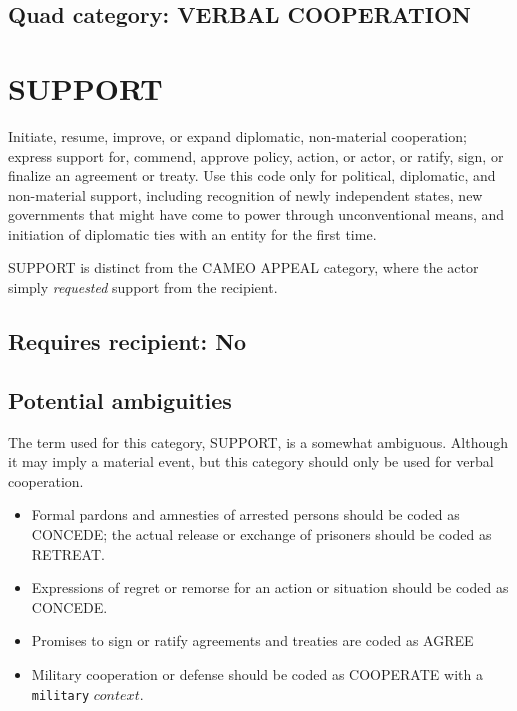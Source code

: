 \documentclass[11pt]{report}
\newcommand{\plcat}[1]{\textsf{#1}}
\newcommand{\txt}[1]{\texttt{#1}}
\begin{document}
\subsection{Quad category: VERBAL COOPERATION}


\newpage

\section{SUPPORT}

Initiate, resume, improve, or expand diplomatic, non-material cooperation; express support for, commend, approve policy, action, or actor, or ratify, sign, or finalize an agreement or treaty. Use this code only for political, diplomatic, and non-material support, including recognition of newly independent states, new governments that might have come to power through unconventional means, and initiation of diplomatic ties with an entity for the first time.

\plcat{SUPPORT} is distinct from the CAMEO \plcat{APPEAL} category, where the actor simply \textit{requested} support from the recipient.

\subsection{Requires recipient: No}

\subsection{Potential ambiguities}

The term used for this category, \plcat{SUPPORT}, is a somewhat ambiguous. Although it may imply a material event, but this category should only be used for verbal cooperation.

\begin{itemize}
\item Formal pardons and amnesties of arrested persons should be coded as \plcat{CONCEDE}; the actual release  or exchange of prisoners should be coded as \plcat{RETREAT}.

\item Expressions of regret or remorse for an action or situation should be coded as \plcat{CONCEDE}.

\item Promises to sign or ratify agreements and treaties are coded as \plcat{AGREE}

\item Military cooperation or defense should be coded as \plcat{COOPERATE} with a \txt{military} $context.$
\end{itemize}
\end{document}
